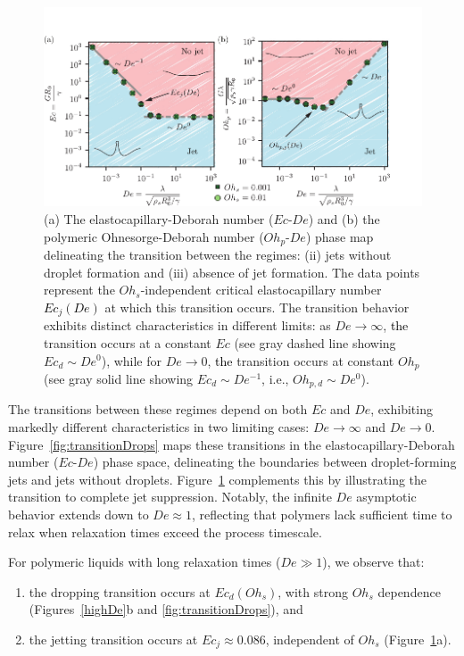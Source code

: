 \documentclass{jfm}
\newcommand{\AO}[1]{{\textcolor{black}{#1}}}
\newcommand{\AKD}[1]{{\textcolor{black}{#1}}}
\newcommand{\oo}{\color{magenta} \normalfont}
\newcommand{\bb}{\color{black} \normalfont}
\begin{document}
\begin{figure}
	\centering
	\includegraphics[width=\textwidth]{Figures/Transition/Transtion_08_OnlyJet-eps-converted-to.pdf}
	\caption{(a) The elastocapillary-Deborah number ($Ec$-$De$) and (b) the polymeric Ohnesorge-Deborah number ($Oh_p$-$De$) phase map delineating the transition between the regimes: (ii) jets without droplet formation and (iii) absence of jet formation. The data points represent the $Oh_s$-independent critical elastocapillary number \AO{$Ec_j(De)$} at which this transition occurs. The transition behavior exhibits distinct characteristics in different limits: as $De \to \infty$, \AKD{the} transition occurs at a constant $Ec$ (see gray dashed line showing $Ec_d \sim De^0$), while for $De \to 0$, \AKD{the} transition occurs at constant $Oh_p$ (see gray solid line showing $Ec_d \sim De^{-1}$, i.e., $Oh_{p,d} \sim De^0$).}
	\label{fig:transitionJets}
\end{figure}

\oo
The transitions between these regimes depend on both $Ec$ and $De$, exhibiting markedly different characteristics in two limiting cases: $De \to \infty$ and $De \to 0$.
Figure~\ref{fig:transitionDrops} maps these transitions in the elastocapillary-Deborah number ($Ec$-$De$) phase space, delineating the boundaries between droplet-forming jets and jets without droplets. Figure~\ref{fig:transitionJets} complements this by illustrating the transition to complete jet suppression. Notably, the infinite $De$ asymptotic behavior extends down to $De \approx 1$, reflecting that polymers lack sufficient time to relax when relaxation times exceed the process timescale.
\bb

For polymeric liquids with long relaxation times ($De \gg 1$), we observe that:

\begin{enumerate}
	\item the dropping transition occurs at $Ec_d(Oh_s)$, with strong $Oh_s$ dependence (Figures~\ref{highDe}b and \ref{fig:transitionDrops}), and
	\item the jetting transition occurs at $Ec_j \approx 0.086$, independent of $Oh_s$ (Figure~\ref{fig:transitionJets}a).
\end{enumerate}
\end{document}
